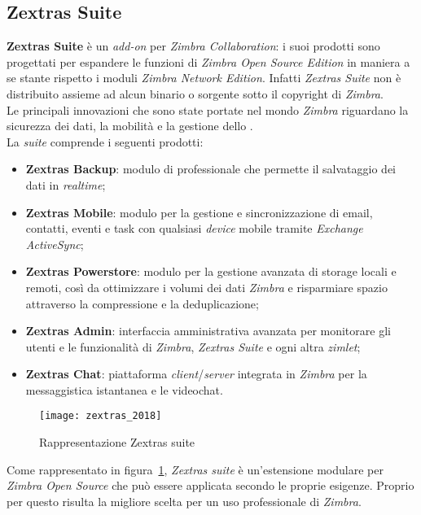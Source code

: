 \subsection{Zextras Suite} \label{subsec:Zextras}
\textbf{Zextras Suite} è un \emph{add-on} per \emph{Zimbra Collaboration}: i suoi prodotti sono progettati per espandere le funzioni di \emph{Zimbra Open Source Edition} in maniera a se stante rispetto i moduli \emph{Zimbra Network Edition}. Infatti \emph{Zextras Suite} non è distribuito assieme ad alcun binario o sorgente sotto il copyright di \emph{Zimbra}. \\
Le principali innovazioni che sono state portate nel mondo \emph{Zimbra} riguardano la sicurezza dei dati, la mobilità e la gestione dello .\\ \newpage
La \emph{suite} comprende i seguenti prodotti:
	\begin{itemize}
		\item \textbf{Zextras Backup}: modulo di  professionale che permette il salvataggio dei dati in \emph{realtime};
		\item \textbf{Zextras Mobile}: modulo per la gestione e sincronizzazione di email, contatti, eventi e task con qualsiasi \emph{device} mobile tramite \emph{Exchange ActiveSync};
		\item \textbf{Zextras Powerstore}: modulo per la gestione avanzata di storage locali e remoti, così da ottimizzare i volumi dei dati \emph{Zimbra} e risparmiare spazio attraverso la compressione e la deduplicazione;
		\item \textbf{Zextras Admin}: interfaccia amministrativa avanzata per monitorare gli utenti e le funzionalità di \emph{Zimbra}, \emph{Zextras Suite} e ogni altra \emph{zimlet};
		\item \textbf{Zextras Chat}: piattaforma \emph{client}/\emph{server} integrata in \emph{Zimbra} per la messaggistica istantanea e le videochat.
	\end{itemize}

\begin{figure}[H] 
	\centering
	\texttt{[image: zextras\_2018]}
	\caption{Rappresentazione Zextras suite}
	\label{fig:modulizextras}
\end{figure}
Come rappresentato in figura~\ref{fig:modulizextras}, \emph{Zextras suite} è un'estensione modulare per \emph{Zimbra Open Source} che può essere applicata secondo le proprie esigenze. Proprio per questo risulta la migliore scelta per un uso professionale di \emph{Zimbra}.

